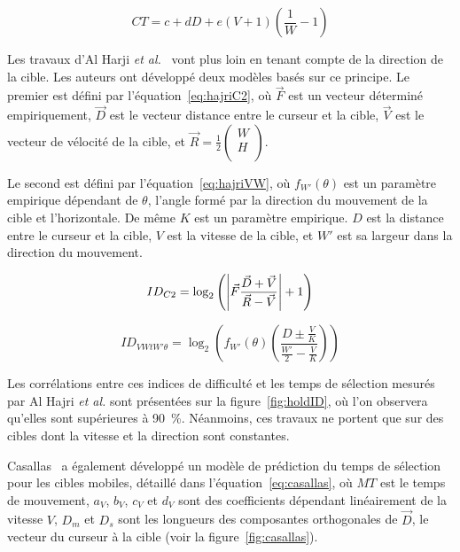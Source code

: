 	\begin{equation}
		\label{eq:jagacinski}
		CT = c + dD + e(V + 1) \left(\frac{1}{W} - 1\right)
	\end{equation}
	
	Les travaux d'Al Harji \emph{et al.}~\cite{hajri2011moving} vont plus loin en tenant compte de la direction de la cible. Les auteurs ont développé deux modèles basés sur ce principe. Le premier est défini par l'équation~\ref{eq:hajriC2}, où $\vec{F}$ est un vecteur déterminé empiriquement, $\vec{D}$ est le vecteur distance entre le curseur et la cible, $\vec{V}$ est le vecteur de vélocité de la cible, et $\vec{R} = \frac{1}{2} \begin{pmatrix}
	W \\ H \\
	\end{pmatrix}$.
	
	Le second est défini par l'équation~\ref{eq:hajriVW}, où $f_{W'}(\theta)$ est un paramètre empirique dépendant de $\theta$, l'angle formé par la direction du mouvement de la cible et l'horizontale. De même $K$ est un paramètre empirique. $D$ est la distance entre le curseur et la cible, $V$ est la vitesse de la cible, et $W'$ est sa largeur dans la direction du mouvement.
	
	\begin{equation}
		\label{eq:hajriC2}
		ID_{C2} = \log_{2}\left(\abs*{\vec{F} \frac{\vec{D}+\vec{V}}{\vec{R}-\vec{V}}} + 1 \right)
	\end{equation}
	
	\begin{equation}
		\label{eq:hajriVW}
		ID_{VWtW'\theta} = \log_{2}\left( f_{W'}(\theta) \left( \frac{D \pm \frac{V}{K}}{\frac{W'}{2} - \frac{V}{K}} \right) \right)
	\end{equation}
	
	Les corrélations entre ces indices de difficulté et les temps de sélection mesurés par Al Hajri \emph{et al.} sont présentées sur la figure~\ref{fig:holdID}, où l'on observera qu'elles sont supérieures à 90~\%{}. Néanmoins, ces travaux ne portent que sur des cibles dont la vitesse et la direction sont constantes.
		
	Casallas~\cite{casallas2015prediction} a également développé un modèle de prédiction du temps de sélection pour les cibles mobiles, détaillé dans l'équation~\ref{eq:casallas}, où $MT$ est le temps de mouvement, $a_{V}$, $b_{V}$, $c_{V}$ et $d_{V}$ sont des coefficients dépendant linéairement de la vitesse $V$, $D_{m}$ et $D_{s}$ sont les longueurs des composantes orthogonales de $\vec{D}$, le vecteur du curseur à la cible (voir la figure~\ref{fig:casallas}).
	

